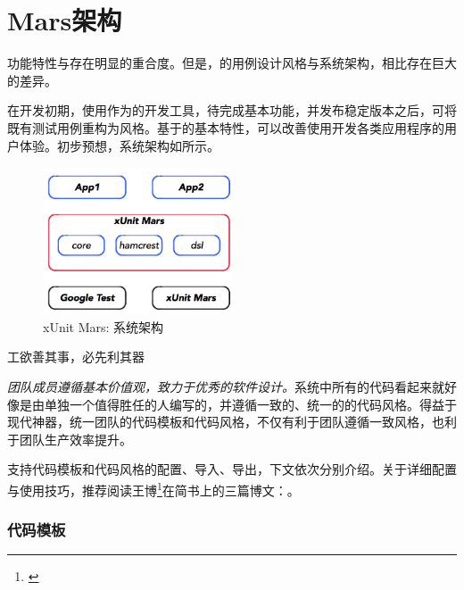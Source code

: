 \section{Mars架构}
	
\begin{content}

功能特性与存在明显的重合度。但是，的用例设计风格与系统架构，相比存在巨大的差异。

在开发初期，使用作为的开发工具，待完成基本功能，并发布稳定版本之后，可将既有测试用例重构为风格。基于的基本特性，可以改善使用开发各类应用程序的用户体验。初步预想，系统架构如所示。

\begin{figure}[H]
\centering
\includegraphics[width=0.5\textwidth]{figures/xunit/framework.png}
\caption{xUnit Mars: 系统架构}
 \label{fig:mars-framework}
\end{figure}

\begin{episode}{工欲善其事，必先利其器}
\begin{content}

\emph{团队成员遵循基本价值观，致力于优秀的软件设计。}系统中所有的代码看起来就好像是由单独一个值得胜任的人编写的，并遵循一致的、统一的的代码风格。得益于现代神器，统一团队的代码模板和代码风格，不仅有利于团队遵循一致风格，也利于团队生产效率提升。

支持代码模板和代码风格的配置、导入、导出，下文依次分别介绍。关于详细配置与使用技巧，推荐阅读王博\footnote{\href{https://www.jianshu.com/u/92b7d9879f20}{}}在简书上的三篇博文：\href{https://www.jianshu.com/p/dafcdce1f9cb}{}。

\subsubsection{代码模板}


\end{content}
\end{episode}
\end{content}
